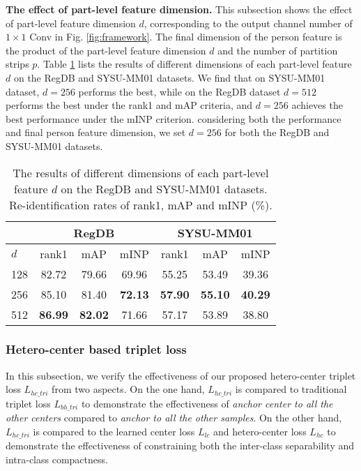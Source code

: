 \documentclass[journal]{IEEEtran}
\begin{document}
\textbf{The effect of part-level feature dimension.} This subsection shows the effect of part-level feature dimension $d$, corresponding to the output channel number of $1 \times 1$ Conv in Fig. \ref{fig:framework}. The final dimension of the person feature is the product of the part-level feature dimension $d$ and the number of partition strips $p$. Table \ref{tab:dimension} lists the results of different dimensions of each part-level feature $d$ on the RegDB and SYSU-MM01 datasets. We find that on SYSU-MM01 dataset, $d = 256$ performs the best, while on the RegDB dataset $d=512$ performs the best under the rank1 and mAP criteria, and $d=256$ achieves the best performance under the mINP criterion.
considering both the performance and final person feature dimension, we set $d=256$ for both the RegDB and SYSU-MM01 datasets.


\begin{table}
\caption{The results of different dimensions of each part-level feature $d$ on the RegDB and SYSU-MM01 datasets. Re-identification rates of rank1, mAP and mINP (\%).}
\label{tab:dimension}
  \centering
\begin{tabular}{l|c|c|c|c|c|c}
   \toprule[2pt]
    & \multicolumn{3}{c|}{RegDB} & \multicolumn{3}{c}{SYSU-MM01}\\ \hline
    $d$ & rank1 & mAP & mINP & rank1 & mAP & mINP \\ \toprule[1pt]
    128 & 82.72 & 79.66 & 69.96 & 55.25 & 53.49 & 39.36\\
    256 & 85.10 & 81.40 & \textbf{72.13} & \textbf{57.90} & \textbf{55.10} & \textbf{40.29} \\
    512 & \textbf{86.99} & \textbf{82.02} & 71.66 & 57.17 & 53.89 & 38.80\\ \toprule[2pt]
  \end{tabular}
\end{table}

\subsubsection{Hetero-center based triplet loss}
\label{sssec:ctri}

In this subsection, we verify the effectiveness of our proposed hetero-center triplet loss $L_{hc\_tri}$ from two aspects. On the one hand, $L_{hc\_tri}$ is compared to traditional triplet loss $L_{bh\_tri}$ to demonstrate the effectiveness of \emph{anchor center to all the other centers} compared to \emph{anchor to all the other samples}. On the other hand, $L_{hc\_tri}$ is compared to the learned center loss $L_{lc}$ and hetero-center loss $L_{hc}$ to demonstrate the effectiveness of constraining both the inter-class separability and intra-class compactness.
\end{document}
